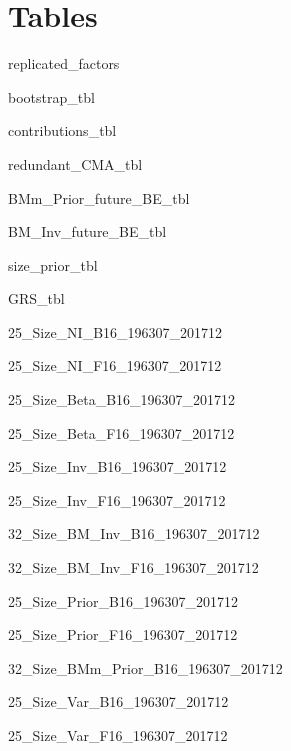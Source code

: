 
\section{Tables} \label{sec:tables}

{replicated_factors}

\begin{landscape}
{bootstrap_tbl}
\end{landscape}

{contributions_tbl}

{redundant_CMA_tbl}

{BMm_Prior_future_BE_tbl}

{BM_Inv_future_BE_tbl}

{size_prior_tbl}

{GRS_tbl}

{25_Size_NI_B16_196307_201712}

{25_Size_NI_F16_196307_201712}

{25_Size_Beta_B16_196307_201712}

{25_Size_Beta_F16_196307_201712}

{25_Size_Inv_B16_196307_201712}

{25_Size_Inv_F16_196307_201712}

\begin{landscape}
{32_Size_BM_Inv_B16_196307_201712}
\end{landscape}

\begin{landscape}
{32_Size_BM_Inv_F16_196307_201712}
\end{landscape}

{25_Size_Prior_B16_196307_201712}

{25_Size_Prior_F16_196307_201712}


\begin{landscape}
{32_Size_BMm_Prior_B16_196307_201712}
\end{landscape}

{25_Size_Var_B16_196307_201712}

{25_Size_Var_F16_196307_201712}

